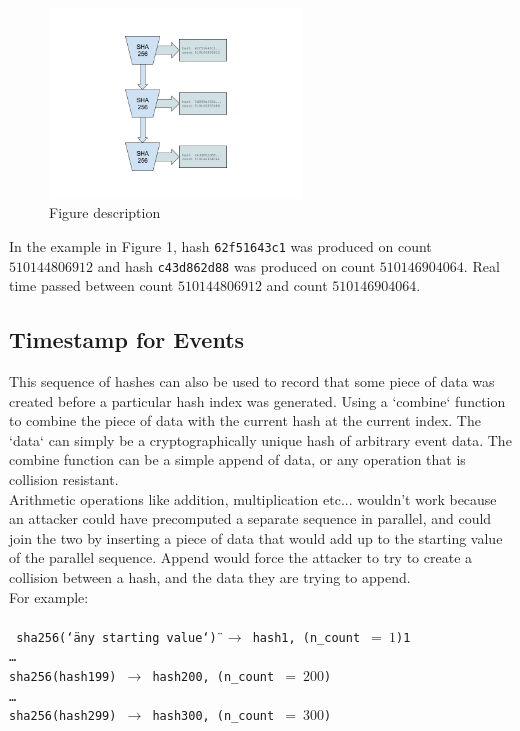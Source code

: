\documentclass[12pt]{article}
\begin{document}
\begin{figure}
  \begin{center}
    \centering
    \includegraphics[width=0.6\textwidth]{figures/fig_1.png}
    \caption[Fig 1]{Figure description \label{fig_1}}
  \end{center}
  \end{figure}
In the example in Figure 1, hash \texttt{62f51643c1} was produced on
count $510144806912$ and hash \texttt{c43d862d88} was produced on
count $510146904064$. Real time passed between count $510144806912$
and count $510146904064$.

\subsection{Timestamp for Events}

This sequence of hashes can also be used to record that some piece of data was created before a particular hash index was generated.  Using a `combine` function to combine the piece of data with the current hash at the current index. The `data` can simply be a cryptographically unique hash of arbitrary event data. The combine function can be a simple append of data, or any operation that is collision resistant.\\

Arithmetic operations like addition, multiplication etc... wouldn’t work because an attacker could have precomputed a separate sequence in parallel, and could join the two by inserting a piece of data that would add up to the starting value of the parallel sequence. Append would force the attacker to try to create a collision between a hash, and the data they are trying to append.\\


\noindent For example:\\\\\noindent
\texttt{
sha256(\char`\"any starting value\char`\") $\rightarrow$ hash1,
(n\_count $=~1$)1\\
\ldots\\
sha256(hash199) $\rightarrow$ hash200, (n\_count $=~200$)\\
\ldots\\
sha256(hash299) $\rightarrow$ hash300, (n\_count $=~300$)\\
}
\end{document}
